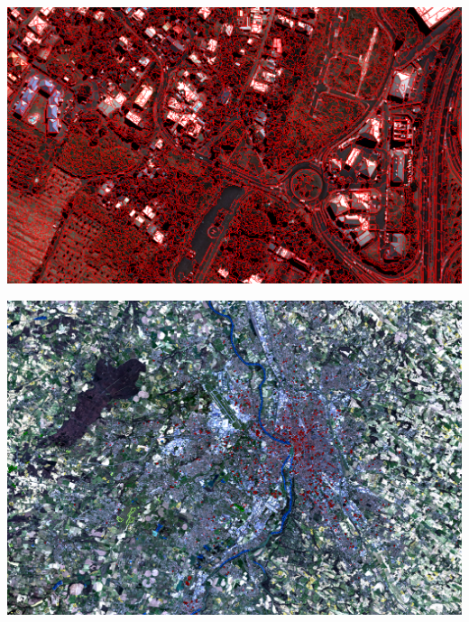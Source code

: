 \documentclass[8pt]{beamer}
\begin{document}
\vspace*{-6.5mm}
\begin{frame}[plain]
\hspace*{-11mm}
    \includegraphics[keepaspectratio,height=1.1\paperheight]{images/segmentation.png}
\end{frame}

\vspace*{-6.5mm}
\begin{frame}[plain]
\hspace*{-11mm}
    \includegraphics[keepaspectratio,height=1.1\paperheight]{../../Courses/org/WorkshopGuide/Images/samples_selection.png}
\end{frame}
\end{document}
